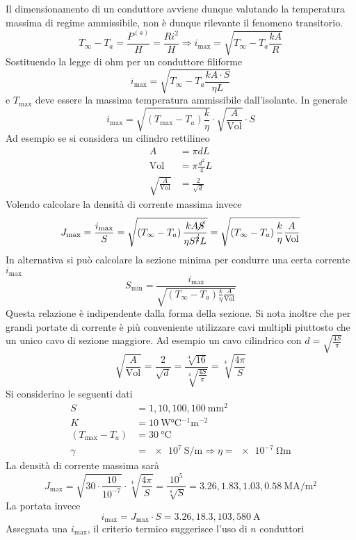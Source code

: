 Il dimensionamento di un conduttore avviene dunque valutando la temperatura massima
di regime ammissibile, non è dunque rilevante il fenomeno transitorio.
$$
T_\infty - T_a = \frac{P^{(a)}}{H} = \frac{Ri^2}{H} \Rightarrow i_{\text{max}} = \sqrt{T_\infty-T_a\frac{kA}{R}}
$$
Sostituendo la legge di ohm per un conduttore filiforme
$$
i_{\text{max}} = \sqrt{T_\infty-T_a\frac{kA\cdot S}{\eta L}}
$$
e $T_{\text{max}}$ deve essere la massima temperatura ammissibile dall'isolante.
In generale 
$$
i_{\text{max}} = \sqrt{\left(T_\text{max} - T_a\right)\frac{k}{\eta}} \cdot \sqrt{\frac{A}{\text{Vol}}}\cdot S
$$
Ad esempio se si considera un cilindro rettilineo
\begin{align*}
A &= \pi d L \\
\text{Vol} &= \pi \frac{d^2}{4} L\\
\sqrt{\frac{A}{\text{Vol}}} &= \frac{2}{\sqrt{d}}
\end{align*}
Volendo calcolare la densità di corrente massima invece
$$
J_{\text{max}} = \frac{i_\text{max}}{S} = \sqrt{\left(T_\infty -T_a\right)\frac{kA\cancel{S}}{\eta S ^{\cancel{2}}L}} = \sqrt{\left(T_\infty -T_a\right)\frac{k}{\eta}\frac{A}{\text{Vol}}}
$$
In alternativa si può calcolare la sezione minima per condurre una certa corrente $i_\text{max}$
$$
S_\text{min} = \frac{i_\text{max}}{\sqrt{\left(T_\infty -T_a\right)\frac{k}{\eta}\frac{A}{\text{Vol}}}}
$$
Questa relazione è indipendente dalla forma della sezione.
Si nota inoltre che per grandi portate di corrente è più conveniente utilizzare cavi 
multipli piuttosto che un unico cavo di sezione maggiore.
Ad esempio un cavo cilindrico con $d = \sqrt{\frac{4S}{\pi}}$
$$
\sqrt{\frac{A}{\text{Vol}}} = \frac{2}{\sqrt{d}} = \frac{\sqrt[4]{16}}{\sqrt[4]{\frac{4S}{\pi}}} = \sqrt[4]{\frac{4\pi}{S}}
$$
Si considerino le seguenti dati
\begin{align*}
S &= 1,10,100,100\ \si{\milli\meter^2} \\
K &= \SI{10}{\watt\celsius^{-1}\meter^{-2}}\\
\left(T_\text{max}-T_a\right) &= \SI{30}{\celsius} \\
\gamma &= \SI{e7}{\siemens\per\meter} \Rightarrow \eta = \SI{e-7}{\ohm\meter}
\end{align*}
La densità di corrente massima sarà
$$
J_\text{max} = \sqrt{30\cdot\frac{10}{10^{-7}}}\cdot \sqrt[4]{\frac{4\pi}{S}} = \frac{10^5}{\sqrt[4]{S}} = 3.26,1.83,1.03,0.58 \ \si{\mega\ampere\per\meter^2}
$$
La portata invece
$$
i_\text{max} = J_\text{max}\cdot S = 3.26,18.3,103,580 \ \si{\ampere}
$$
Assegnata una $i_\text{max}$, il criterio termico suggerisce l'uso di $n$ conduttori
